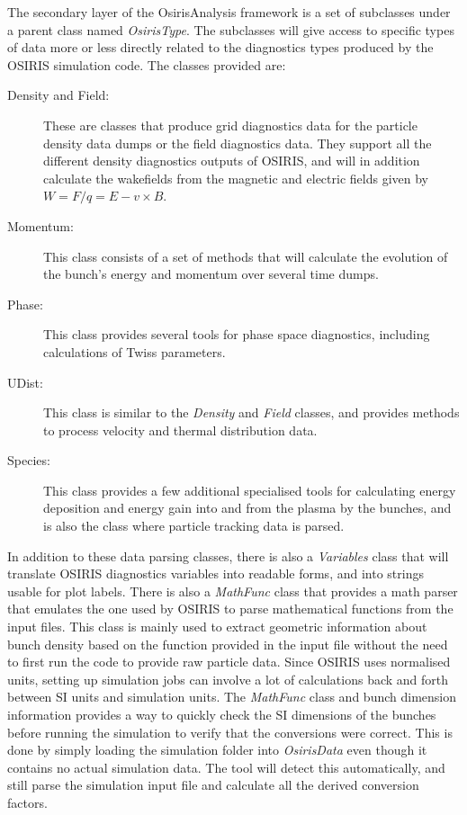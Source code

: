 The secondary layer of the OsirisAnalysis framework is a set of subclasses under a parent class named \emph{OsirisType}.
The subclasses will give access to specific types of data more or less directly related to the diagnostics types produced by the OSIRIS simulation code. The classes provided are:

\begin{description}
    \item[Density and Field:] These are classes that produce grid diagnostics data for the particle density data dumps or the field diagnostics data.
    They support all the different density diagnostics outputs of OSIRIS, and will in addition calculate the wakefields from the magnetic and electric fields given by $W = F/q = E - v \times B$.
    \item[Momentum:] This class consists of a set of methods that will calculate the evolution of the bunch's energy and momentum over several time dumps.
    \item[Phase:] This class provides several tools for phase space diagnostics, including calculations of Twiss parameters.
    \item[UDist:] This class is similar to the \emph{Density} and \emph{Field} classes, and provides methods to process velocity and thermal distribution data.
    \item[Species:] This class provides a few additional specialised tools for calculating energy deposition and energy gain into and from the plasma by the bunches, and is also the class where particle tracking data is parsed.
\end{description}

In addition to these data parsing classes, there is also a \emph{Variables} class that will translate OSIRIS diagnostics variables into readable forms, and into strings usable for plot labels.
There is also a \emph{MathFunc} class that provides a math parser that emulates the one used by OSIRIS to parse mathematical functions from the input files.
This class is mainly used to extract geometric information about bunch density based on the function provided in the input file without the need to first run the code to provide raw particle data.
Since OSIRIS uses normalised units, setting up simulation jobs can involve a lot of calculations back and forth between SI units and simulation units.
The \emph{MathFunc} class and bunch dimension information provides a way to quickly check the SI dimensions of the bunches before running the simulation to verify that the conversions were correct.
This is done by simply loading the simulation folder into \emph{OsirisData} even though it contains no actual simulation data.
The tool will detect this automatically, and still parse the simulation input file and calculate all the derived conversion factors.

